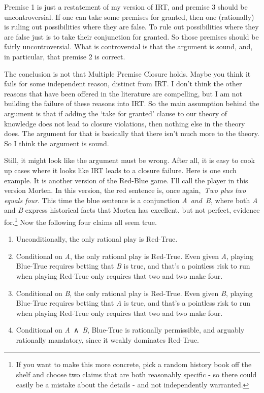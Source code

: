 \documentclass[
  10pt,
  letterpaper,
  twoside]{scrbook}
\providecommand{\tightlist}{%
  \setlength{\itemsep}{0pt}\setlength{\parskip}{0pt}}\usepackage{longtable,booktabs,array}
\begin{document}
Premise 1 is just a restatement of my version of IRT, and premise 3
should be uncontroversial. If one can take some premises for granted,
then one (rationally) is ruling out possibilities where they are false.
To rule out possibilities where they are false just is to take their
conjunction for granted. So those premises should be fairly
uncontroversial. What is controversial is that the argument is sound,
and, in particular, that premise 2 is correct.

The conclusion is not that Multiple Premise Closure holds. Maybe you
think it fails for some independent reason, distinct from IRT. I don't
think the other reasons that have been offered in the literature are
compelling, but I am not building the failure of these reasons into IRT.
So the main assumption behind the argument is that if adding the `take
for granted' clause to our theory of knowledge does not lead to closure
violations, then nothing else in the theory does. The argument for that
is basically that there isn't much more to the theory. So I think the
argument is sound.

Still, it might look like the argument must be wrong. After all, it is
easy to cook up cases where it looks like IRT leads to a closure
failure. Here is one such example. It is another version of the Red-Blue
game. I'll call the player in this version Morten. In this version, the
red sentence is, once again,~\emph{Two plus two equals four}. This time
the blue sentence is a conjunction \emph{A~and~B}, where both \emph{A}
and \emph{B} express historical facts that Morten has excellent, but not
perfect, evidence for.\footnote{If you want to make this more concrete,
  pick a random history book off the shelf and choose two claims that
  are both reasonably specific - so there could easily be a mistake
  about the details - and not independently warranted.} Now the
following four claims all seem true.

\begin{enumerate}
\def\labelenumi{\arabic{enumi}.}
\tightlist
\item
  Unconditionally, the only rational play is Red-True.
\item
  Conditional on \emph{A}, the only rational play is Red-True. Even
  given \emph{A}, playing Blue-True requires betting that \emph{B} is
  true, and that's a pointless risk to run when playing Red-True only
  requires that two and two make four.
\item
  Conditional on \emph{B}, the only rational play is Red-True. Even
  given \emph{B}, playing Blue-True requires betting that \emph{A} is
  true, and that's a pointless risk to run when playing Red-True only
  requires that two and two make four.
\item
  Conditional on \emph{A}~∧~\emph{B}, Blue-True is rationally
  permissible, and arguably rationally mandatory, since it weakly
  dominates Red-True.
\end{enumerate}
\end{document}
